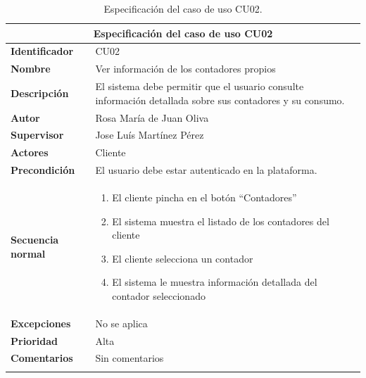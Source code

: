 \documentclass[pdftex,11pt,a4paper]{book}
\begin{document}
\begin{center}
\begin{longtable}{|m{}|m{11cm}|}
\hline
\multicolumn{2}{|c|}{\textbf{Especificación del caso de uso CU02}}\\
\hline 
\endhead

\textbf{Identificador} & CU02  
\\ \hline
\textbf{Nombre} & Ver información de los contadores propios
\\ \hline
\textbf{Descripción} & El sistema debe permitir que el usuario consulte información detallada sobre sus contadores y su consumo.
\\ \hline
\textbf{Autor} & Rosa María de Juan Oliva 
\\ \hline
\textbf{Supervisor} & Jose Luís Martínez Pérez  
\\ \hline
\textbf{Actores} & Cliente
\\ \hline
\textbf{Precondición} & El usuario debe estar autenticado en la plataforma.
\\ \hline
\textbf{Secuencia normal} & 
\begin{enumerate}
\addtolength{\itemsep}{-3mm}
\item El cliente pincha en el botón “Contadores”
\item El sistema muestra el listado de los contadores del cliente
\item El cliente selecciona un contador
\item El sistema le muestra información detallada del contador seleccionado
\end{enumerate}
\\ \hline
\textbf{Excepciones} & No se aplica
\\ \hline
\textbf{Prioridad} & Alta  
\\ \hline
\textbf{Comentarios} & Sin comentarios  
\\ \hline

\caption{Especificación del caso de uso CU02.} \label{tablalarga:tablaCU02}
\end{longtable}
\end{center}




\renewcommand{\tablename}{Tabla}
\renewcommand{\arraystretch}{1,7}
\end{document}
